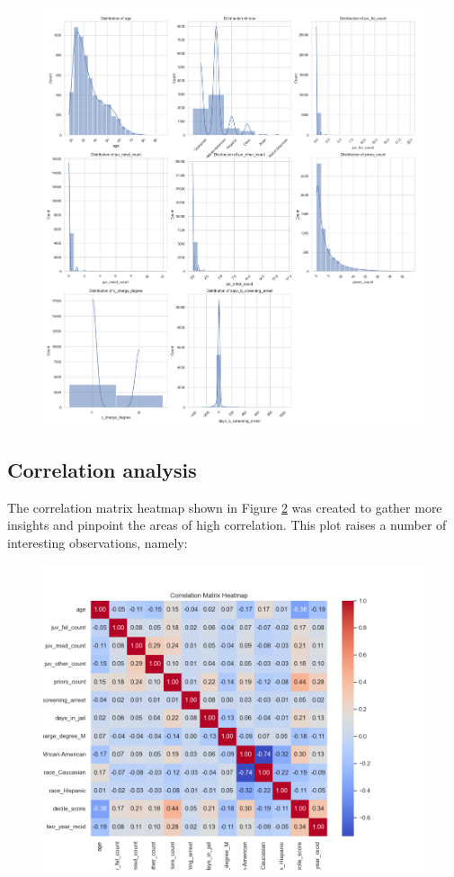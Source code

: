\documentclass[conference]{IEEEtran}
\begin{document}
	
	\begin{figure}[H]
		\centering
		\includegraphics[width=0.9\linewidth]{img/distribution-plots}
		\caption{}
		\label{fig:distribution-plots}
	\end{figure}
	
	
	\subsection{Correlation analysis}
	
	The correlation matrix heatmap shown in Figure \ref{fig:correlationmatrixheatmap} was created to gather more insights and pinpoint the areas of high correlation. This plot raises a number of interesting observations, namely:
	
	\begin{figure}[!h]
		\centering
		\includegraphics[width=0.7\linewidth]{img/correlation_matrix_heatmap}
		\caption{}
		\label{fig:correlationmatrixheatmap}
	\end{figure}
	
\end{document}
